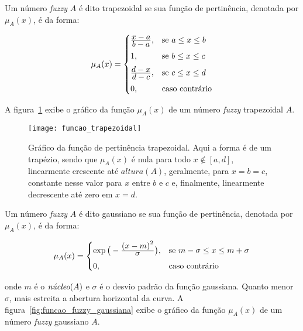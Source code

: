 \begin{defn}
\label{def:funcao_fuzzy_trapezoidal}
Um número \emph{fuzzy} $A$ é dito trapezoidal se sua função de pertinência, denotada por $\mu_{A}(x)$, é da forma:

\begin{equation}
  \mu_A(x) =  \begin{cases}
                \frac{\displaystyle x - a}{\displaystyle b - a}, & \text{se}\ a \leq x \leq b\\[0.5em]
                1, & \text{se}\ b \leq x \leq c\\[0.5em]
                \frac{\displaystyle d - x}{\displaystyle d - c}, & \text{se}\ c \leq x \leq d\\[0.5em]
                0, & \text{caso contrário}
              \end{cases}
\end{equation}
\end{defn}

A figura~\ref{fig:funcao_fuzzy_trapezoidal} exibe o gráfico da função $\mu_A(x)$ de um número \emph{fuzzy} trapezoidal $A$.

\begin{figure}[!h]
  \centering
  \texttt{[image: funcao\_trapezoidal]}
  \caption[Gráfico da função de pertinência trapezoidal]{Gráfico da função de pertinência trapezoidal. Aqui a forma é de um trapézio, sendo que $\mu_A(x)$ é nula para todo $x \notin [a, d]$, linearmente  crescente  até $altura(A)$, geralmente, para $x = b = c$, constante nesse valor para $x$ entre $b$ e $c$ e, finalmente, linearmente decrescente até zero em $x = d$.}
  \label{fig:funcao_fuzzy_trapezoidal}
\end{figure}

\begin{defn}
\label{def:funcao_fuzzy_gaussiana}
Um número \emph{fuzzy} $A$ é dito gaussiano se sua função de pertinência, denotada por $\mu_{A}(x)$, é da forma:

\begin{equation}
  \mu_A(x) =  \begin{cases}
                \exp{\big(-\ensuremath{\frac{\displaystyle {(x - m)}^2}{\displaystyle \sigma}} \big)}, & \text{se}\ m - \sigma \leq x \leq m + \sigma\\[0.5em]
                0, & \text{caso contrário}
              \end{cases}
\end{equation}
\end{defn}
\noindent onde $m$ é o $\emph{núcleo}(A)$ e $\sigma$ é o desvio padrão da função gaussiana. Quanto menor $\sigma$, mais estreita a abertura horizontal da curva. A figura~\ref{fig:funcao_fuzzy_gaussiana} exibe o gráfico da função $\mu_A(x)$ de um número \emph{fuzzy} gaussiano $A$.

